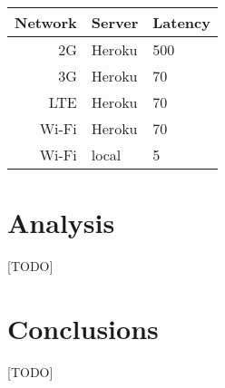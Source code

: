 \documentclass[12pt,a4paper,english,oneside]{article}
\begin{document}
\begin{multicols}{2}
\begin{center}
  \begin{tabular}{rll}
    Network & Server & Latency \\
    \hline
    2G & Heroku & 500 \\
    3G & Heroku & 70 \\
    LTE & Heroku & 70 \\
    Wi-Fi & Heroku & 70 \\
    Wi-Fi & local & 5 \\
    \hline
  \end{tabular}
\end{center}

\section{Analysis}

[TODO]

\section{Conclusions}

[TODO]







\end{multicols}
\end{document}
